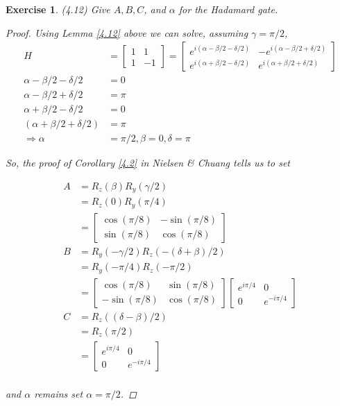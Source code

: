 \documentclass[11pt]{article}
\newcommand\0{\mathbf{0}}
\newcommand\<{\langle}
\renewcommand\>{\rangle}
\renewcommand\implies{\Rightarrow}
\newtheorem{exercise}[theorem]{Exercise}
\begin{document}
\begin{exercise} (4.12) Give $A, B, C$, and $\alpha$ for the Hadamard gate.

\begin{proof}
	Using Lemma \ref{4.12} above we can solve, assuming $\gamma = \pi / 2$, 
	\begin{align*}
		H &= \begin{bmatrix}
 1 & 1 \\ 1 & -1	
 \end{bmatrix} = \begin{bmatrix}
 	e^{i(\alpha - \beta / 2 - \delta / 2)} & -e^{i (\alpha - \beta /2 + \delta / 2)} \\ 
 	e^{i(\alpha + \beta / 2 - \delta / 2)} & e^{i (\alpha + \beta /2 + \delta / 2)}
 \end{bmatrix} \\ 
 \alpha - \beta / 2 - \delta / 2 &= 0 \\
 \alpha - \beta /2 + \delta / 2 &= \pi \\
 \alpha + \beta / 2 - \delta / 2 &= 0 \\
 (\alpha + \beta /2 + \delta / 2) &= \pi \\
 \implies \alpha &= \pi / 2, \beta = 0, \delta = \pi
	\end{align*}

So, the proof of Corollary \ref{4.2} in Nielsen \& Chuang tells us to set 

\begin{align*}
A &= R_z (\beta)R_y(\gamma / 2) \\
&= R_z (0)R_y(\pi / 4) \\
&= \begin{bmatrix}
 	\cos(\pi / 8) & -\sin(\pi / 8) \\
 	\sin(\pi / 8) & \cos(\pi / 8)
 \end{bmatrix}\\
B &= R_y(-\gamma/2)R_z(- (\delta+\beta)/2)\\
&= R_y(- \pi/4)R_z(- \pi/2)\\
&=  \begin{bmatrix}
 	\cos(\pi / 8) & \sin(\pi / 8) \\
 	-\sin(\pi / 8) & \cos(\pi / 8)
 \end{bmatrix} \begin{bmatrix}
 	e^{i\pi / 4} & 0 \\
 	0 & e^{- i\pi / 4}
 \end{bmatrix}\\
C &= R_z((\delta - \beta)/2)\\
&= R_z(\pi /2) \\
&= \begin{bmatrix}
 	e^{i\pi / 4} & 0 \\
 	0 & e^{- i\pi / 4}
 \end{bmatrix}\\
\end{align*}

and $\alpha$ remains set $\alpha = \pi / 2$.
\end{proof}	
\end{exercise}
\end{document}
